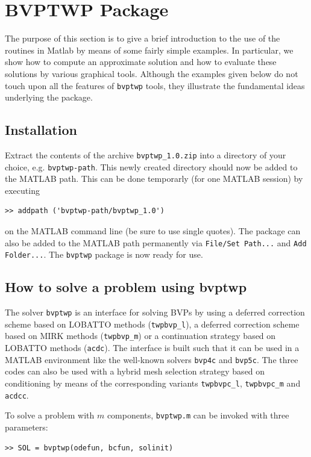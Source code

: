\documentclass{article}
\begin{document}
\section{BVPTWP Package}\label{bvptwp}
The purpose of this section is to give a brief introduction to the use of the routines
in Matlab by means of some fairly simple examples. In particular, we show how to
compute an approximate solution and how to evaluate these solutions by various graphical
tools. Although the examples given below do not touch upon all the features of
\texttt{bvptwp} tools, they illustrate the fundamental ideas underlying the
package.
\subsection{Installation}\label{Insta}

Extract the contents of the archive \texttt{bvptwp\_1.0.zip} into a directory of your choice, e.g.
\texttt{bvptwp-path}. This newly created directory should now be added to the MATLAB path. This
can be done temporarly (for one MATLAB session) by executing
\begin{verbatim}
>> addpath ('bvptwp-path/bvptwp_1.0')
\end{verbatim}
on the MATLAB command line (be sure to use single quotes). The package can also be added to the MATLAB path permanently via
\texttt{File/Set Path...} and \texttt{Add Folder...}. The \texttt{bvptwp} package is now ready for use.

\subsection{How to solve a problem using bvptwp}\label{solver}
The solver \texttt{bvptwp} is an interface for solving BVPs by using
a deferred correction scheme based on LOBATTO methods (\texttt{twpbvp\_l}),
a deferred correction scheme based on MIRK methods
(\texttt{twpbvp\_m}) or a continuation strategy based on
LOBATTO methods (\texttt{acdc}). The interface is built such that it can
 be used in a MATLAB environment like the well-known solvers \texttt{bvp4c} and \texttt{bvp5c}.
 The three codes can also be used with a hybrid mesh selection strategy based on
 conditioning by means of the corresponding variants \texttt{twpbvpc\_l}, \texttt{twpbvpc\_m} and \texttt{acdcc}.

To solve a problem with $m$ components, \texttt{\texttt{bvptwp.m}} can be
invoked with three parameters: 

\begin{verbatim}
>> SOL = bvptwp(odefun, bcfun, solinit)
\end{verbatim}
\end{document}
